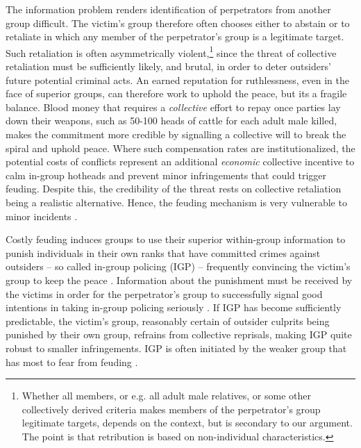The information problem renders identification of perpetrators from another
group difficult. The victim's group therefore often chooses either to abstain or
to retaliate in which any member of the perpetrator's group is a legitimate
target. Such retaliation is often asymmetrically violent,\footnote{ Whether all
	members, or e.g. all adult male relatives, or some other collectively
	derived criteria makes members of the perpetrator’s group legitimate
	targets, depends on the context, but is secondary to our argument. The
point is that retribution is based on non-individual characteristics.} since the
threat of collective retaliation must be sufficiently likely, and brutal, in
order to deter outsiders' future potential criminal acts. An earned reputation
for ruthlessness, even in the face of superior groups, can therefore work to
uphold the peace, but its a fragile balance. Blood money that requires a
\textit{collective} effort to repay once parties lay down their weapons, such as
50-100 heads of cattle for each adult male killed, makes the commitment more
credible by signalling a collective will to break the spiral and uphold peace.
Where such compensation rates are institutionalized, the potential costs of
conflicts represent an additional \textit{economic} collective incentive to calm
in-group hotheads and prevent minor infringements that could trigger feuding.
Despite this, the credibility of the threat rests on collective retaliation
being a realistic alternative. Hence, the feuding mechanism is very vulnerable
to minor incidents \citep{Fearon_1996}.

Costly feuding induces groups to use their superior within-group information to
punish individuals in their own ranks that have committed crimes against
outsiders -- so called in-group policing (IGP) -- frequently convincing the victim's
group to keep the peace \citep[723]{Fearon_1996}. Information about the
punishment must be received by the victims in order for the perpetrator's group
to successfully signal good intentions in taking in-group policing seriously
\citep{Fearon_1996}. If IGP has become sufficiently predictable, the victim’s
group, reasonably certain of outsider culprits being punished by their own
group, refrains from collective reprisals, making IGP quite robust to smaller
infringements. IGP is often initiated by the weaker group that has most to fear
from feuding \citep[50]{Lake_1996}. 

